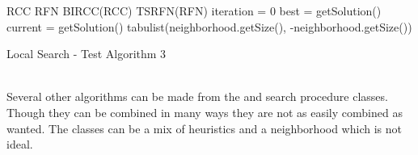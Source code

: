 \IncMargin{1em}
\begin{algorithm}[H]

  \algdata
{} RCC \;
 RFN \;
 BIRCC(RCC) \;
 TSRFN(RFN) \;
\int iteration = 0 \;
\int[] best = getSolution() \;
\int[] current = getSolution() \;
\int[] tabulist(neighborhood.getSize(), -neighborhood.getSize()) \;
\caption{Local Search - Test Algorithm 3} \label{algo_LS3} 
\end{algorithm} \noindent
\DecMargin{1em} \\
Several other algorithms can be made from the  and search procedure classes. Though they can be 
combined in many ways they are not as easily combined as wanted. The  classes can be a mix of 
heuristics and a neighborhood which is not ideal. %



